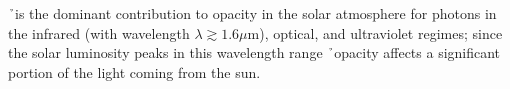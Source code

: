 \h\ is the dominant contribution to opacity in the solar atmosphere for photons in the infrared (with wavelength $\lambda \gtrsim 1.6 \mu$m), optical, and ultraviolet regimes; since the solar luminosity peaks in this wavelength range \h\ opacity affects a significant portion of the light coming from the sun.
